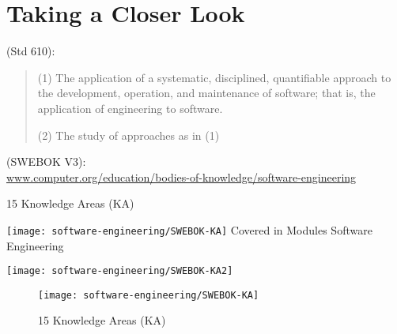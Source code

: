 \section{Taking a Closer Look}
 (Std 610):
\begin{quote}
(1) The application of a systematic, disciplined, quantifiable approach to the development,
   operation, and maintenance of software; that is, the application of engineering to software.

(2) The study of approaches as in (1)
\end{quote}
%
\newslide
{} (SWEBOK V3):\\
\href{https://www.computer.org/education/bodies-of-knowledge/software-engineering}
  {www.computer.org/education/bodies-of-knowledge/software-engineering}
\ifslides

15 Knowledge Areas (KA) %

\texttt{[image: software-engineering/SWEBOK-KA]}
\newslide
Covered in Modules Software Engineering%

\texttt{[image: software-engineering/SWEBOK-KA2]}
\newslide
\else
\begin{figure}[H]
  \texttt{[image: software-engineering/SWEBOK-KA]}
  \caption{15 Knowledge Areas (KA)} %
\end{figure}

